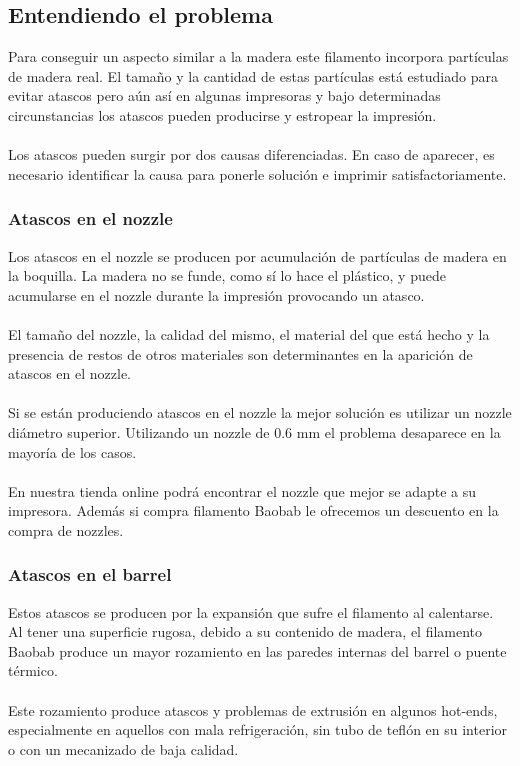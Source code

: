 \documentclass[11pt,a4paper]{article}
\begin{document}
	\subsection{Entendiendo el problema}
Para conseguir un aspecto similar a la madera este filamento incorpora partículas de madera real. El tamaño y la cantidad de estas partículas está estudiado para evitar atascos pero aún así en algunas impresoras y bajo determinadas circunstancias los atascos pueden producirse y estropear la impresión.\\\\
Los atascos pueden surgir por dos causas diferenciadas. En caso de aparecer, es necesario identificar la causa para ponerle solución e imprimir satisfactoriamente.		\subsubsection{Atascos en el nozzle}
Los atascos en el nozzle se producen por acumulación de partículas de madera en la boquilla. La madera no se funde, como sí lo hace el plástico, y puede acumularse en el nozzle durante la impresión provocando un atasco.\\\\
El tamaño del nozzle, la calidad del mismo, el material del que está hecho y la presencia de restos de otros materiales son determinantes en la aparición de atascos en el nozzle.\\\\
Si se están produciendo atascos en el nozzle la mejor solución es utilizar un nozzle diámetro superior. Utilizando un nozzle de 0.6 mm el problema desaparece en la mayoría de los casos.\\\\
En nuestra tienda online podrá encontrar el nozzle que mejor se adapte a su impresora. Además si compra filamento Baobab le ofrecemos un descuento en la compra de nozzles.		\subsubsection{Atascos en el barrel}
Estos atascos se producen por la expansión que sufre el filamento al calentarse. Al tener una superficie rugosa, debido a su contenido de madera, el filamento Baobab produce un mayor rozamiento en las paredes internas del barrel o puente térmico.\\\\
Este rozamiento produce atascos y problemas de extrusión en algunos hot-ends, especialmente en aquellos con mala refrigeración, sin tubo de teflón en su interior o con un mecanizado de baja calidad.%
\end{document}
